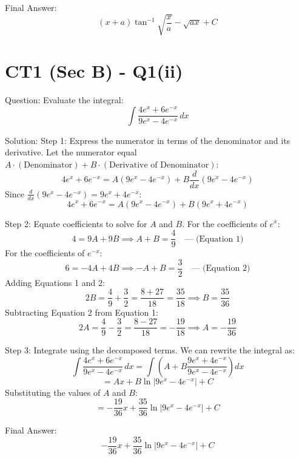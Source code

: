\documentclass{article}
\begin{document}
Final Answer:
\[
\boxed{(x+a)\tan^{-1}\sqrt{\frac{x}{a}} - \sqrt{ax} + C}
\]

\section*{CT1 (Sec B) - Q1(ii)}
Question:
Evaluate the integral:
\[
\int \frac{4e^x+6e^{-x}}{9e^x-4e^{-x}} \, dx
\]

Solution:
Step 1: Express the numerator in terms of the denominator and its derivative.
Let the numerator equal \(A \cdot (\text{Denominator}) + B \cdot (\text{Derivative of Denominator})\):
\[
4e^x + 6e^{-x} = A(9e^x - 4e^{-x}) + B \frac{d}{dx}(9e^x - 4e^{-x})
\]
Since \(\frac{d}{dx}(9e^x - 4e^{-x}) = 9e^x + 4e^{-x}\):
\[
4e^x + 6e^{-x} = A(9e^x - 4e^{-x}) + B(9e^x + 4e^{-x})
\]

Step 2: Equate coefficients to solve for \(A\) and \(B\).
For the coefficients of \(e^x\):
\[
4 = 9A + 9B \implies A + B = \frac{4}{9} \quad \text{--- (Equation 1)}
\]
For the coefficients of \(e^{-x}\):
\[
6 = -4A + 4B \implies -A + B = \frac{3}{2} \quad \text{--- (Equation 2)}
\]
Adding Equations 1 and 2:
\[
2B = \frac{4}{9} + \frac{3}{2} = \frac{8+27}{18} = \frac{35}{18} \implies B = \frac{35}{36}
\]
Subtracting Equation 2 from Equation 1:
\[
2A = \frac{4}{9} - \frac{3}{2} = \frac{8-27}{18} = -\frac{19}{18} \implies A = -\frac{19}{36}
\]

Step 3: Integrate using the decomposed terms.
We can rewrite the integral as:
\[
\int \frac{4e^x + 6e^{-x}}{9e^x - 4e^{-x}} \, dx = \int \left( A + B \frac{9e^x + 4e^{-x}}{9e^x - 4e^{-x}} \right) dx
\]
\[
= Ax + B \ln|9e^x - 4e^{-x}| + C
\]
Substituting the values of \(A\) and \(B\):
\[
= -\frac{19}{36}x + \frac{35}{36}\ln|9e^x - 4e^{-x}| + C
\]

Final Answer:
\[
\boxed{-\frac{19}{36}x + \frac{35}{36}\ln|9e^x - 4e^{-x}| + C}
\]
\end{document}
